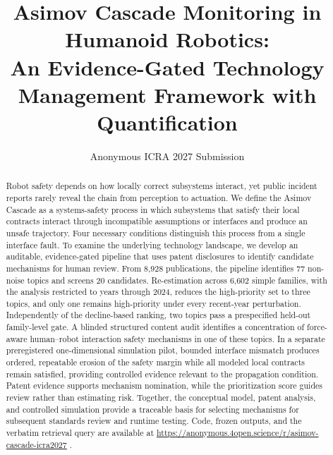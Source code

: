 \documentclass[letterpaper,9pt,conference]{ieeeconf}
\makeatletter
\newcommand{\linebreakand}{\end{@IEEEauthorhalign}\hfill\break\noindent\vspace{1.5ex}\begin{@IEEEauthorhalign}}
\newcommand{\authorgrid}{%
\vtop{\hsize=0.31\textwidth\centering\baselineskip=13pt\sublargesize Author~A$^{1}$\par\baselineskip=11pt\normalsize Affiliation anonymized\par for review\par}%
\hspace{0.035\textwidth}%
\vtop{\hsize=0.31\textwidth\centering\baselineskip=13pt\sublargesize Author~B$^{2*}$\par\baselineskip=11pt\normalsize Affiliation anonymized\par for review\par email anonymized\par}%
\hspace{0.035\textwidth}%
\vtop{\hsize=0.31\textwidth\centering\baselineskip=13pt\sublargesize Author~C$^{3}$\par\baselineskip=11pt\normalsize Affiliation anonymized\par for review\par}%
\linebreakand
\vtop{\hsize=0.31\textwidth\centering\baselineskip=13pt\sublargesize Author~D$^{4}$\par\baselineskip=11pt\normalsize Affiliation anonymized\par for review\par}%
\hspace{0.035\textwidth}%
\vtop{\hsize=0.31\textwidth\centering\baselineskip=13pt\sublargesize Author~E$^{5}$\par\baselineskip=11pt\normalsize Affiliation anonymized\par for review\par}%
\hspace{0.035\textwidth}%
\vtop{\hsize=0.31\textwidth\centering\baselineskip=13pt\sublargesize Author~F$^{6}$\par\baselineskip=11pt\normalsize Affiliation anonymized\par for review\par}%
\linebreakand
\hspace*{0.345\textwidth}%
\vtop{\hsize=0.31\textwidth\centering\baselineskip=13pt\sublargesize Author~G$^{7}$\par\baselineskip=11pt\normalsize Affiliation anonymized\par for review\par}%
}
\newcommand{\reprourl}{%
  \url{https://anonymous.4open.science/r/asimov-cascade-icra2027}%
}
\makeatother
\begin{document}
\setlength{\abovedisplayskip}{4pt plus 1pt minus 1pt}
\setlength{\belowdisplayskip}{4pt plus 1pt minus 1pt}
\setlength{\abovedisplayshortskip}{3pt plus 1pt}
\setlength{\belowdisplayshortskip}{3pt plus 1pt}

\title{\LARGE \bf
Asimov Cascade Monitoring in Humanoid Robotics:\\
An Evidence-Gated Technology Management Framework with Quantification
}

\newif\ifsubmission
\ifdefined\workingversion
  \submissionfalse
\else
  \submissiontrue  %
\fi

\ifsubmission
\author{Anonymous ICRA 2027 Submission}
\else
\author{\authorgrid}
\fi

\maketitle
\thispagestyle{empty}
\pagestyle{empty}

\begin{abstract}

Robot safety depends on how locally correct subsystems interact, yet public incident reports rarely reveal the chain from perception to actuation. We define the Asimov Cascade as a systems-safety process in which subsystems that satisfy their local contracts interact through incompatible assumptions or interfaces and produce an unsafe trajectory. Four necessary conditions distinguish this process from a single interface fault. To examine the underlying technology landscape, we develop an auditable, evidence-gated pipeline that uses patent disclosures to identify candidate mechanisms for human review. From 8,928 publications, the pipeline identifies 77 non-noise topics and screens 20 candidates. Re-estimation across 6,602 simple families, with the analysis restricted to years through 2024, reduces the high-priority set to three topics, and only one remains high-priority under every recent-year perturbation. Independently of the decline-based ranking, two topics pass a prespecified held-out family-level gate. A blinded structured content audit identifies a concentration of force-aware human--robot interaction safety mechanisms in one of these topics. In a separate preregistered one-dimensional simulation pilot, bounded interface mismatch produces ordered, repeatable erosion of the safety margin while all modeled local contracts remain satisfied, providing controlled evidence relevant to the propagation condition. Patent evidence supports mechanism nomination, while the prioritization score guides review rather than estimating risk. Together, the conceptual model, patent analysis, and controlled simulation provide a traceable basis for selecting mechanisms for subsequent standards review and runtime testing. Code, frozen outputs, and the verbatim retrieval query are available at \reprourl.

\end{abstract}
\end{document}
